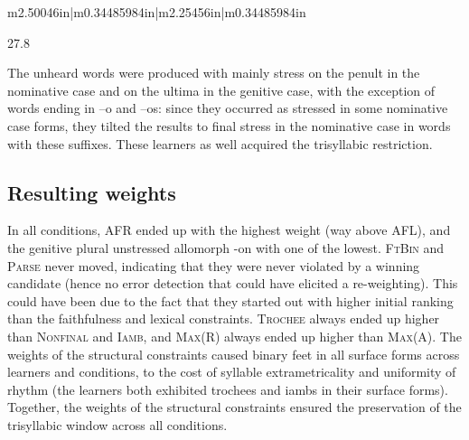 \documentclass[a4paper]{article}
\makeatletter
\newcommand\arraybslash{\let\\\@arraycr}
\makeatother
\begin{document}
\begin{center}
\begin{supertabular}{m{2.50046in}|m{0.34485984in}|m{2.25456in}|m{0.34485984in}}
\par

\par

\par

\par

\par

\par

\raggedleft\arraybslash  27.8\\
\end{supertabular}
\end{center}
\z

The unheard words were produced with mainly stress on the penult in the nominative case and on the ultima in the genitive case, with the exception of words ending in –o and –os: since they occurred as stressed in some nominative case forms, they tilted the results to final stress in the nominative case in words with these suffixes. These learners as well acquired the trisyllabic restriction.

\subsection{
Resulting weights}

In all conditions, AFR ended up with the highest weight (way above AFL), and the genitive plural unstressed allomorph {\textbar}-on{\textbar} with one of the lowest. \textsc{FtBin} and \textsc{Parse} never moved, indicating that they were never violated by a winning candidate (hence no error detection that could have elicited a re-weighting). This could have been due to the fact that they started out with higher initial ranking than the faithfulness and lexical constraints. \textsc{Trochee} always ended up higher than \textsc{Nonfinal }and\textsc{ Iamb}, and \textsc{Max}(R) always ended up higher than \textsc{Max}(A). The weights of the structural constraints caused binary feet in all surface forms across learners and conditions, to the cost of syllable extrametricality and uniformity of rhythm (the learners both exhibited trochees and iambs in their surface forms). Together, the weights of the structural constraints ensured the preservation of the trisyllabic window across all conditions.
\end{document}
